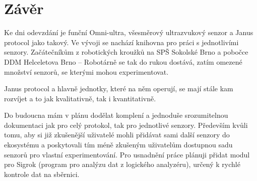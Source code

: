 \newpage
\chapter*{Závěr}

Ke dni odevzdání je funční Omni-ultra, všesměrový ultrazvukový senzor a Janus protocol jako takový.
Ve vývoji se nachází knihovna pro práci s jednotlivími senzory.
Začátečníkům z robotických kroužků na SPŠ Sokolské Brno a pobočce DDM Helceletova Brno -- Robotárně se tak do rukou dostává, zatím omezené množství senzorů, se kterými mohou experimentovat.

Janus protocol a hlavně jednotky, které na něm operují, se mají stále kam rozvíjet a to jak kvalitativně, tak i kvantitativně.

Do budoucna mám v plánu dodělat komplení a jednoduše srozumitelnou dokumentaci jak pro celý protokol, tak pro jednotlivé senzory.
Především kvůli tomu, aby si již zkušenější uživatelé mohli přidávat sami další senzory do ekosystému a poskytovali tím méně zkušeným uživatelům dostupnou sadu senzorů pro vlastní experimentování.
Pro usnadnění práce plánuji přidat modul pro Sigrok (program pro analýzu dat z logického analyzéru), určený k rychlé kontrole dat na sběrnici.

